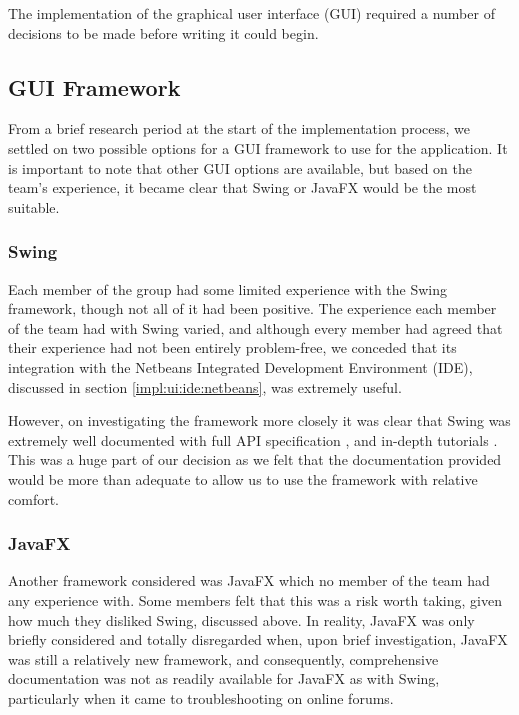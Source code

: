 The implementation of the graphical user interface (GUI) required a number
of decisions to be made before writing it could begin.


\subsection{GUI Framework}
\label{impl:ui:guiframework}

From a brief research period at the start of the implementation 
process, we settled on two possible options for a GUI framework to use
for the application. It is important to note that other GUI options are
available, but based on the team's experience, it became clear that
Swing or JavaFX would be the most suitable.


\subsubsection{Swing}
\label{impl:ui:guiframework:swing}

Each member of the group had some limited experience with the Swing 
framework, though not all of it had been positive.
The experience each member of the team had with Swing varied, and
although every member had agreed that their experience had not been
entirely problem-free, we conceded that its integration with the Netbeans
Integrated Development Environment (IDE), discussed in section
\ref{impl:ui:ide:netbeans}, was extremely useful.

However, on investigating the framework more closely it was clear that
Swing was extremely well documented with full API specification
\cite{swingAPI}, and in-depth tutorials \cite{swingTutorial}.
This was a huge part of our decision as we felt that the documentation
provided would be more than adequate to allow us to use the framework
with relative comfort.


\subsubsection{JavaFX}
\label{impl:ui:guiframework:javafx}

Another framework considered was JavaFX which no member of the team
had any experience with. 
Some members felt that this was a risk worth taking, given how much
they disliked Swing, discussed above.
In reality, JavaFX was only briefly considered and totally disregarded
when, upon brief investigation, JavaFX was still a relatively new
framework, and consequently, comprehensive documentation was not as
readily available for JavaFX as with Swing, particularly when it came 
to troubleshooting on online forums.

